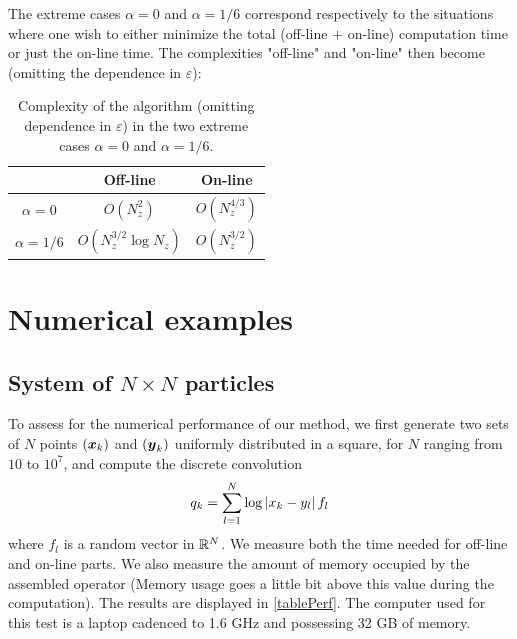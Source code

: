 \documentclass{article}
\begin{document}
\begin{Remark}
	The extreme cases $\alpha= 0$ and $\alpha = 1/6$ correspond respectively to the situations where one wish to either minimize the total (off-line $+$ on-line) computation time or just the on-line time. The complexities "off-line" and "on-line" then become (omitting the dependence in $\varepsilon$):	
	\begin{table}[H]
		\centering
		\begin{tabular}{ |c|c|c| } 
			\hline
			               & Off-line                          & On-line        \\ 
			\hline
			$\alpha = 0$   & $O(N_z^2)$                        & $O(N_z^{4/3})$ \\ 
			$\alpha = 1/6$ & $O\left(N_z^{3/2}\log N_z\right)$ & $O(N_z^{3/2})$ \\ 
			\hline
		\end{tabular}
		\caption{Complexity of the algorithm (omitting dependence in $\varepsilon$) in the two extreme cases $\alpha=0$ and $\alpha = 1/6$.}
	\end{table}									
\end{Remark}
																																																		
\section{Numerical examples}
																																																		
\subsection{System of $N\times N$ particles}
																												
To assess for the numerical performance of our method, we first generate two sets of $N$ points $(\boldsymbol{x}_k)$ and $(\boldsymbol{y}_k)$ uniformly distributed in a square, for $N$ ranging from $10$ to $10^7$, and compute the discrete convolution  
\[ q_k = \sum_{l=1}^N \log\left\lvert x_k - y_l \right\rvert f_l\]
where $f_l$ is a random vector in $\mathbb{R}^{N}$.
We measure both the time needed for off-line and on-line parts. We also measure the amount of memory occupied by the assembled operator (Memory usage goes a little bit above this value during the computation). The results are displayed in \autoref{tablePerf}. The computer used for this test is a laptop cadenced to 1.6 GHz and possessing 32 GB of memory. 
																																																		
\end{document}
